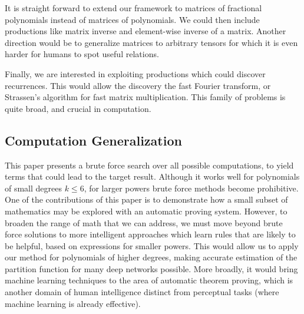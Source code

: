 It is straight forward to extend our framework to matrices of fractional
polynomials instead of matrices of polynomials.  We could
then include productions like matrix inverse and element-wise inverse of
a matrix.  Another direction would be to generalize matrices to arbitrary tensors
for which it is even harder for humans to spot useful relations.

Finally, we are interested in exploiting productions which could discover 
recurrences. This would allow the discovery the fast Fourier transform, or
Strassen's algorithm for fast matrix multiplication. This family of problems is quite broad,
and crucial in computation.


\subsection{Computation Generalization}
\label{subsec:agenda}

This paper presents a brute force search over all possible computations, 
to yield terms that could lead to the target result. Although it works
well for polynomials of small degrees $k \leq 6$, for larger powers 
brute force methods become prohibitive. One of the contributions of this paper is to
demonstrate how a small subset of mathematics may be explored with an automatic proving
system. However, to broaden the range of math that we can address, we
must move beyond brute force solutions to more intelligent approaches
which learn rules that are likely to be helpful, based on expressions
for smaller powers. This would allow us to apply our method for polynomials of 
higher degrees, making accurate estimation of the partition function for many deep
networks possible. More broadly, it would bring machine learning techniques
to the area of automatic theorem proving, which is another domain of
human intelligence distinct from perceptual tasks (where machine
learning is already effective). 




